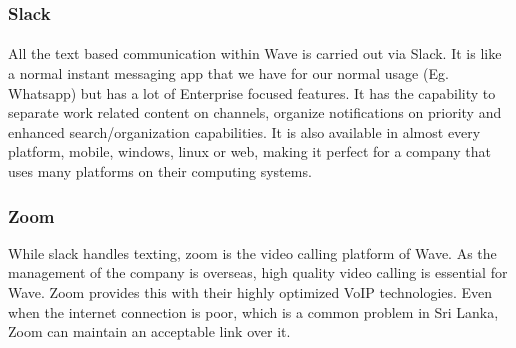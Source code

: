 \subsubsection{Slack}
\paragraph{}
All the text based communication within Wave is carried out via Slack. It is like a normal instant messaging app that we have for our normal usage (Eg. Whatsapp) but has a lot of Enterprise focused features. It has the capability to separate work related content on channels, organize notifications on priority and enhanced search/organization capabilities. It is also available in almost every platform, mobile, windows, linux or web, making it perfect for a company that uses many platforms on their computing systems.

\subsubsection{Zoom}
While slack handles texting, zoom is the video calling platform of Wave. As the management of the company is overseas, high quality video calling is essential for Wave. Zoom provides this with their highly optimized VoIP technologies. Even when the internet connection is poor, which is a common problem in Sri Lanka, Zoom can maintain an acceptable link over it. 